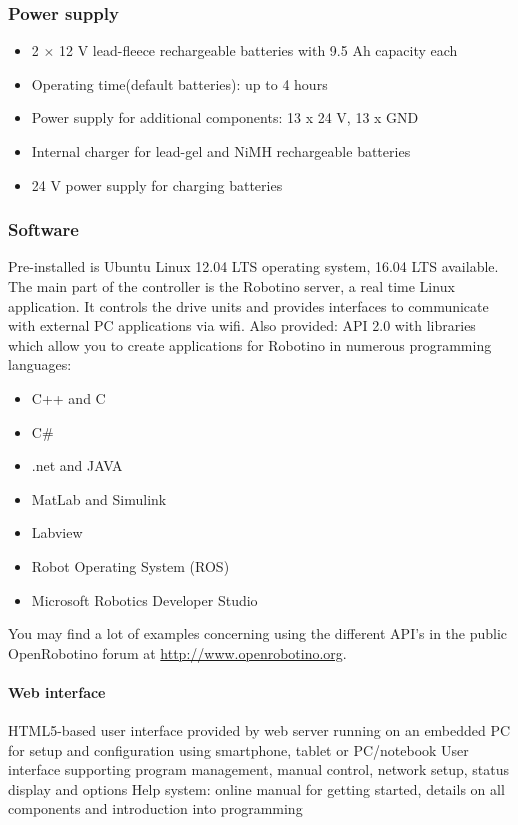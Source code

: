 \documentclass[12pt,twoside]{article}
\begin{document}
\begin{appendix}
\subsubsection{Power supply}
\begin{itemize}
\item 2 $\times$ 12 V lead-fleece rechargeable batteries with 9.5 Ah
  capacity each
\item Operating time(default batteries): up to 4 hours
\item Power supply for additional components: 13 x 24 V, 13 x GND
\item Internal charger for lead-gel and NiMH rechargeable batteries
\item 24 V power supply for charging batteries
\end{itemize}

\subsubsection{Software}
Pre-installed is Ubuntu Linux 12.04 LTS operating system, 16.04 LTS available.
The main part of the controller is the Robotino server, a real time Linux
application. It controls the drive units and provides interfaces to
communicate with external PC applications via wifi. Also provided: API
2.0 with libraries which allow you to create applications for Robotino
in numerous programming languages:

\begin{itemize}
\item C++ and C
\item C\#
\item .net and JAVA
\item MatLab and Simulink
\item Labview
\item Robot Operating System (ROS)
\item Microsoft Robotics Developer Studio
\end{itemize}

You may find a lot of examples concerning using the different API's in
the public OpenRobotino forum at \url{http://www.openrobotino.org}.

\paragraph{Web interface}
HTML5-based user interface provided by web server running on an embedded
PC for setup and configuration using smartphone, tablet or PC/notebook
User interface supporting program management, manual control, network
setup, status display and options Help system: online manual for
getting started, details on all components and introduction into
programming


\end{appendix}
\end{document}
